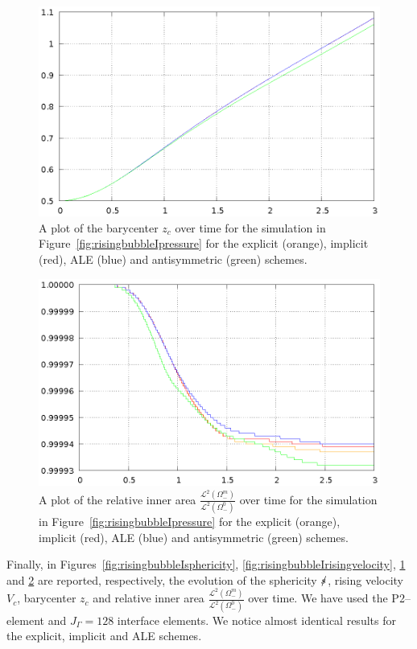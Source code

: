 \begin{figure}[htbp]
\centering
\includegraphics[width=.45\textwidth]
{figures/navier_stokes/2d_rising_bubble_barycenter.ps}
\caption[Navier--Stokes rising bubble I barycenter]
{A plot of the barycenter $z_c$ over time for the simulation in
Figure~\ref{fig:risingbubbleIpressure} for the explicit (orange), implicit
(red), ALE (blue) and antisymmetric (green) schemes.}
\label{fig:risingbubbleIbarycenter}
\end{figure}

\begin{figure}[htbp]
\centering
\includegraphics[width=.45\textwidth]
{figures/navier_stokes/2d_rising_bubble_inner_volume.ps}
\caption[Navier--Stokes rising bubble I inner area]
{A plot of the relative inner area
$\frac{\mathcal{L}^2(\Omega^m_-)}{\mathcal{L}^2(\Omega^0_-)}$ over time for the
simulation in Figure~\ref{fig:risingbubbleIpressure} for the explicit
(orange), implicit (red), ALE (blue) and antisymmetric (green) schemes.}
\label{fig:risingbubbleIinnervolume}
\end{figure}

Finally, in Figures~\ref{fig:risingbubbleIsphericity},
\ref{fig:risingbubbleIrisingvelocity}, \ref{fig:risingbubbleIbarycenter} and
\ref{fig:risingbubbleIinnervolume} are reported, respectively, the evolution of
the sphericity $\mbox{$s\!\!\!\!\:/$}$, rising velocity $V_c$, barycenter $z_c$ and relative
inner area $\frac{\mathcal{L}^2(\Omega^m_-)}{\mathcal{L}^2(\Omega^0_-)}$ over
time. We have used the P2--\pdg element and $J_\Gamma=128$ interface elements.
We notice almost identical results for the explicit, implicit and ALE schemes.

